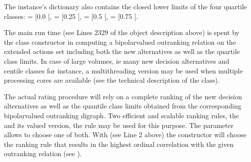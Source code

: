 \documentclass[a4paper,10pt,english]{sphinxhowto}
\begin{document}
The  instance’s  dictionary also contains the closed lower limits of the four quartile classes:  = {[}0.0\sphinxhyphen{} {[},  = {[}0.25\sphinxhyphen{} {[},  = {[}0.5\sphinxhyphen{} {[},  = {[}0.75 \sphinxhyphen{} {[}.

\begin{sphinxVerbatim}[commandchars=\\\{\},numbers=left,firstnumber=1,stepnumber=1]
\end{sphinxVerbatim}

The main run time (see Lines 23\sphinxhyphen{}29 of the object description above) is spent by the class constructor in computing a bipolar\sphinxhyphen{}valued outranking relation on the extended actions set including both the new alternatives as well as the quartile class limits. In case of large volumes, ie many new decision alternatives and centile classes for instance, a multi\sphinxhyphen{}threading version may be used when multiple processing cores are available (see the technical description of the  class).

The actual rating procedure will rely on a complete ranking of the new decision alternatives as well as the quantile class limits obtained from the corresponding bipolar\sphinxhyphen{}valued outranking digraph. Two efficient and scalable ranking rules, the  and its valued version, the  rule may be used for this purpose. The  parameter allows to choose one of both. With  (see Line 2 above) the  constructor will choose the ranking rule that results in the highest ordinal correlation with the given outranking relation (see ).
\end{document}
